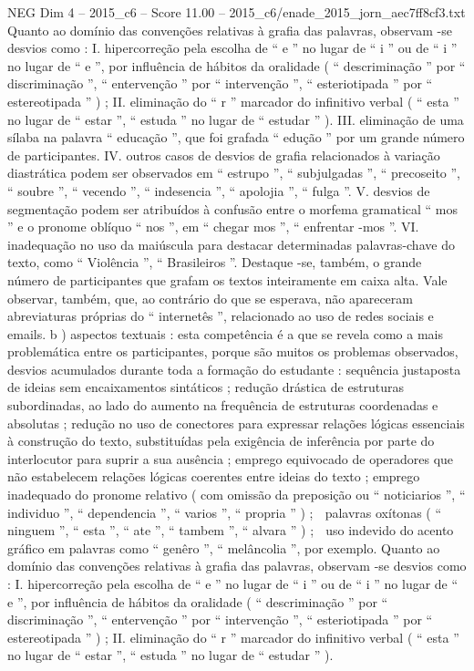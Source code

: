 \begin{textsample}{NEG Dim 4 – 2015\_c6 – Score 11.00 – 2015\_c6/enade\_2015\_jorn\_aec7ff8cf3.txt}
Quanto ao domínio das convenções relativas à grafia das palavras, observam -se desvios como : I. hipercorreção pela escolha de “ e ” no lugar de “ i ” ou de “ i ” no lugar de “ e ”, por influência de hábitos da oralidade ( “ descriminação ” por “ discriminação ”, “ entervenção ” por “ intervenção ”, “ esteriotipada ” por “ estereotipada ” ) ; II. eliminação do “ r ” marcador do infinitivo verbal ( “ esta ” no lugar de “ estar ”, “ estuda ” no lugar de “ estudar ” ).
III. eliminação de uma sílaba na palavra “ educação ”, que foi grafada “ edução ” por um grande número de participantes.
IV. outros casos de desvios de grafia relacionados à variação diastrática podem ser observados em “ estrupo ”, “ subjulgadas ”, “ precoseito ”, “ soubre ”, “ vecendo ”, “ indesencia ”, “ apolojia ”, “ fulga ”.
V. desvios de segmentação podem ser atribuídos à confusão entre o morfema gramatical “ mos ” e o pronome oblíquo “ nos ”, em “ chegar mos ”, “ enfrentar -mos ”.
VI. inadequação no uso da maiúscula para destacar determinadas palavras-chave do texto, como “ Violência ”, “ Brasileiros ”.
Destaque -se, também, o grande número de participantes que grafam os textos inteiramente em caixa alta.
Vale observar, também, que, ao contrário do que se esperava, não apareceram abreviaturas próprias do “ internetês ”, relacionado ao uso de redes sociais e emails. b ) aspectos textuais : esta competência é a que se revela como a mais problemática entre os participantes, porque são muitos os problemas observados, desvios acumulados durante toda a formação do estudante : sequência justaposta de ideias sem encaixamentos sintáticos ; redução drástica de estruturas subordinadas, ao lado do aumento na frequência de estruturas coordenadas e absolutas ; redução no uso de conectores para expressar relações lógicas essenciais à construção do texto, substituídas pela exigência de inferência por parte do interlocutor para suprir a sua ausência ; emprego equivocado de operadores que não estabelecem relações lógicas coerentes entre ideias do texto ; emprego inadequado do pronome relativo ( com omissão da preposição ou “ noticiarios ”, “ individuo ”, “ dependencia ”, “ varios ”, “ propria ” ) ;  palavras oxítonas ( “ ninguem ”, “ esta ”, “ ate ”, “ tambem ”, “ alvara ” ) ;  uso indevido do acento gráfico em palavras como “ genêro ”, “ melâncolia ”, por exemplo.
Quanto ao domínio das convenções relativas à grafia das palavras, observam -se desvios como : I. hipercorreção pela escolha de “ e ” no lugar de “ i ” ou de “ i ” no lugar de “ e ”, por influência de hábitos da oralidade ( “ descriminação ” por “ discriminação ”, “ entervenção ” por “ intervenção ”, “ esteriotipada ” por “ estereotipada ” ) ; II. eliminação do “ r ” marcador do infinitivo verbal ( “ esta ” no lugar de “ estar ”, “ estuda ” no lugar de “ estudar ” ).

\end{textsample}
